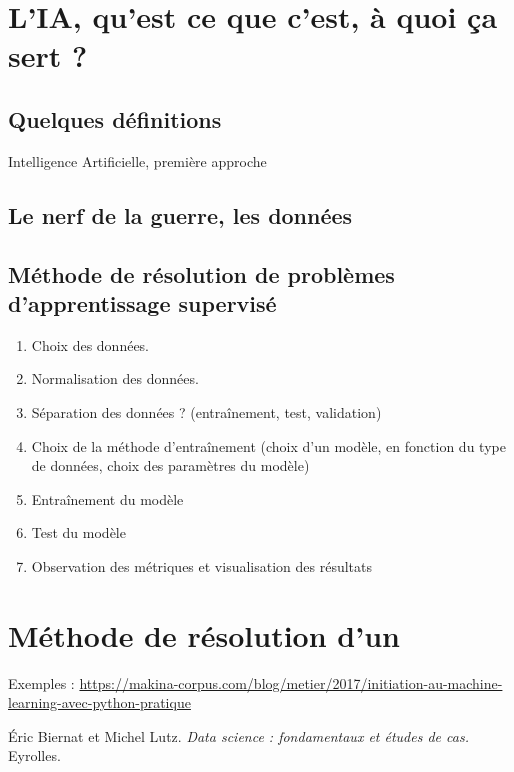 \section{L'IA, qu'est ce que c'est, à quoi ça sert ?}

\subsection{Quelques définitions}
\begin{defi}{Intelligence Artificielle, première approche}

\end{defi}

\subsection{Le nerf de la guerre, les données}



\subsection{Méthode de résolution de problèmes d'apprentissage supervisé}

\begin{enumerate}
\item Choix des données.
\item Normalisation des données. 
\item Séparation des données ? (entraînement, test, validation)
\item Choix de la méthode d’entraînement (choix d'un modèle, en fonction du type de données, choix des paramètres du modèle)
\item Entraînement du modèle
\item Test du modèle
\item Observation des métriques et visualisation des résultats
\end{enumerate}

\section{Méthode de résolution d'un }



Exemples : 
\url{https://makina-corpus.com/blog/metier/2017/initiation-au-machine-learning-avec-python-pratique}

\begin{thebibliography}{2}
    Éric Biernat et Michel Lutz. {\it Data science : fondamentaux et études de cas.} Eyrolles.
\end{thebibliography}

